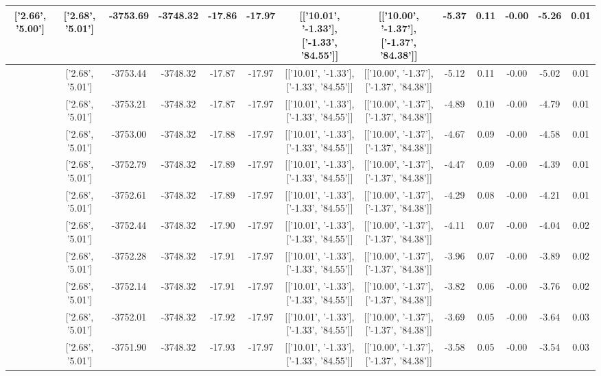 \begin{table}[htbp]
\begin{adjustbox}{angle=90}
\begin{tabular}{|c|c|c|c|c|c|c|c|c|c|c|c|c|}
 ['2.66', '5.00'] & ['2.68', '5.01'] & -3753.69 & -3748.32 & -17.86 & -17.97 & [['10.01', '-1.33'], ['-1.33', '84.55']] & [['10.00', '-1.37'], ['-1.37', '84.38']] & -5.37 & 0.11 & -0.00 & -5.26 & 0.01\\ \hline
 ['2.66', '5.00'] & ['2.68', '5.01'] & -3753.44 & -3748.32 & -17.87 & -17.97 & [['10.01', '-1.33'], ['-1.33', '84.55']] & [['10.00', '-1.37'], ['-1.37', '84.38']] & -5.12 & 0.11 & -0.00 & -5.02 & 0.01\\ \hline
 ['2.66', '5.00'] & ['2.68', '5.01'] & -3753.21 & -3748.32 & -17.87 & -17.97 & [['10.01', '-1.33'], ['-1.33', '84.55']] & [['10.00', '-1.37'], ['-1.37', '84.38']] & -4.89 & 0.10 & -0.00 & -4.79 & 0.01\\ \hline
 ['2.67', '5.00'] & ['2.68', '5.01'] & -3753.00 & -3748.32 & -17.88 & -17.97 & [['10.01', '-1.33'], ['-1.33', '84.55']] & [['10.00', '-1.37'], ['-1.37', '84.38']] & -4.67 & 0.09 & -0.00 & -4.58 & 0.01\\ \hline
 ['2.67', '5.00'] & ['2.68', '5.01'] & -3752.79 & -3748.32 & -17.89 & -17.97 & [['10.01', '-1.33'], ['-1.33', '84.55']] & [['10.00', '-1.37'], ['-1.37', '84.38']] & -4.47 & 0.09 & -0.00 & -4.39 & 0.01\\ \hline
 ['2.67', '5.00'] & ['2.68', '5.01'] & -3752.61 & -3748.32 & -17.89 & -17.97 & [['10.01', '-1.33'], ['-1.33', '84.55']] & [['10.00', '-1.37'], ['-1.37', '84.38']] & -4.29 & 0.08 & -0.00 & -4.21 & 0.01\\ \hline
 ['2.67', '5.00'] & ['2.68', '5.01'] & -3752.44 & -3748.32 & -17.90 & -17.97 & [['10.01', '-1.33'], ['-1.33', '84.55']] & [['10.00', '-1.37'], ['-1.37', '84.38']] & -4.11 & 0.07 & -0.00 & -4.04 & 0.02\\ \hline
 ['2.67', '5.00'] & ['2.68', '5.01'] & -3752.28 & -3748.32 & -17.91 & -17.97 & [['10.01', '-1.33'], ['-1.33', '84.55']] & [['10.00', '-1.37'], ['-1.37', '84.38']] & -3.96 & 0.07 & -0.00 & -3.89 & 0.02\\ \hline
 ['2.67', '5.00'] & ['2.68', '5.01'] & -3752.14 & -3748.32 & -17.91 & -17.97 & [['10.01', '-1.33'], ['-1.33', '84.55']] & [['10.00', '-1.37'], ['-1.37', '84.38']] & -3.82 & 0.06 & -0.00 & -3.76 & 0.02\\ \hline
 ['2.67', '5.00'] & ['2.68', '5.01'] & -3752.01 & -3748.32 & -17.92 & -17.97 & [['10.01', '-1.33'], ['-1.33', '84.55']] & [['10.00', '-1.37'], ['-1.37', '84.38']] & -3.69 & 0.05 & -0.00 & -3.64 & 0.03\\ \hline
 ['2.67', '5.00'] & ['2.68', '5.01'] & -3751.90 & -3748.32 & -17.93 & -17.97 & [['10.01', '-1.33'], ['-1.33', '84.55']] & [['10.00', '-1.37'], ['-1.37', '84.38']] & -3.58 & 0.05 & -0.00 & -3.54 & 0.03\\ \hline

\end{tabular}
\end{adjustbox}
\end{table}
